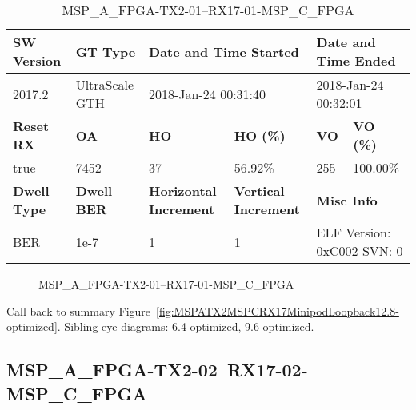 \begin{table}[h]
\centering
\caption{MSP\_A\_FPGA-TX2-01--RX17-01-MSP\_C\_FPGA}
\label{tab:MSPAFPGATX201RX1701MSPCFPGA12.8-optimized}
\begin{tabular}{@{}|l|l|l|l|l|l|@{}}
\toprule
\textbf{SW Version}                & \textbf{GT Type}   & \multicolumn{2}{l|}{\textbf{Date and Time Started}}            & \multicolumn{2}{l|}{\textbf{Date and Time Ended}}        \\ \midrule
2017.2                       & UltraScale GTH          & \multicolumn{2}{l|}{2018-Jan-24 00:31:40}                   & \multicolumn{2}{l|}{2018-Jan-24 00:32:01}               \\ \midrule
\textbf{Reset RX}                  & \textbf{OA} & \textbf{HO}   & \textbf{HO (\%)} & \textbf{VO} & \textbf{VO (\%)} \\ \midrule
true & 7452        & 37          & 56.92\%        & 255        & 100.00\%       \\ \midrule
\textbf{Dwell Type}                & \textbf{Dwell BER} & \textbf{Horizontal Increment} & \textbf{Vertical Increment}    & \multicolumn{2}{l|}{\textbf{Misc Info}}                  \\ \midrule
BER                            & 1e-7        & 1        & 1           & \multicolumn{2}{l|}{ELF Version: 0xC002 SVN: 0}                         \\ \bottomrule
\end{tabular}
\end{table}

\begin{figure}[h]
\caption{MSP\_A\_FPGA-TX2-01--RX17-01-MSP\_C\_FPGA} \label{fig:MSPAFPGATX201RX1701MSPCFPGA12.8-optimized}
\end{figure}

Call back to summary Figure~\ref{fig:MSPATX2MSPCRX17MinipodLoopback12.8-optimized}.
Sibling eye diagrams: \hyperref[sec:MSPAFPGATX201RX1701MSPCFPGA6.4-optimized]{6.4-optimized}, \hyperref[sec:MSPAFPGATX201RX1701MSPCFPGA9.6-optimized]{9.6-optimized}.

\clearpage
\newpage


\subsection{MSP\_A\_FPGA-TX2-02--RX17-02-MSP\_C\_FPGA}\label{sec:MSPAFPGATX202RX1702MSPCFPGA12.8-optimized}

